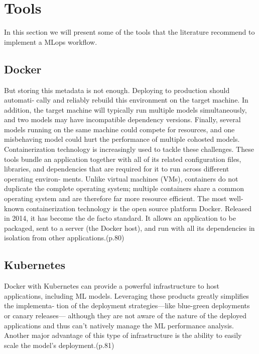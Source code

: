 \section{Tools}\label{sec:tools}

In this section we will present some of the tools that the literature recommend to implement a MLops workflow.

\subsection{Docker}
But storing this metadata is not enough. Deploying to production should automati‐
cally and reliably rebuild this environment on the target machine. In addition, the
target machine will typically run multiple models simultaneously, and two models
may have incompatible dependency versions. Finally, several models running on the
same machine could compete for resources, and one misbehaving model could hurt
the performance of multiple cohosted models.
Containerization technology is increasingly used to tackle these challenges. These
tools bundle an application together with all of its related configuration files, libraries,
and dependencies that are required for it to run across different operating environ‐
ments. Unlike virtual machines (VMs), containers do not duplicate the complete
operating system; multiple containers share a common operating system and are
therefore far more resource efficient.
The most well-known containerization technology is the open source platform
Docker. Released in 2014, it has become the de facto standard. It allows an application
to be packaged, sent to a server (the Docker host), and run with all its dependencies
in isolation from other applications.\cite{treveil2020introducing}(p.80)

\subsection{Kubernetes}

Docker with Kubernetes can provide a powerful infrastructure to host applications,
including ML models. Leveraging these products greatly simplifies the implementa‐
tion of the deployment strategies—like blue-green deployments or canary releases—
although they are not aware of the nature of the deployed applications and thus can’t
natively manage the ML performance analysis. Another major advantage of this type
of infrastructure is the ability to easily scale the model’s deployment.\cite{treveil2020introducing}(p.81)

